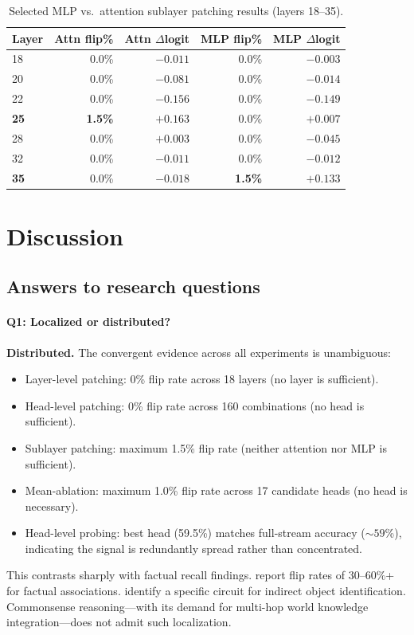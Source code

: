\documentclass{article}
\begin{document}
\begin{table}[t]
\centering
\small
\caption{Selected MLP vs.\ attention sublayer patching results (layers 18--35).}
\label{tab:sublayer}
\begin{tabular}{lrrrr}
\toprule
\textbf{Layer} & \textbf{Attn flip\%} & \textbf{Attn $\Delta$logit} & \textbf{MLP flip\%} & \textbf{MLP $\Delta$logit} \\
\midrule
18 & 0.0\% & $-0.011$ & 0.0\% & $-0.003$ \\
20 & 0.0\% & $-0.081$ & 0.0\% & $-0.014$ \\
22 & 0.0\% & $-0.156$ & 0.0\% & $-0.149$ \\
\textbf{25} & \textbf{1.5\%} & $\mathbf{+0.163}$ & 0.0\% & $+0.007$ \\
28 & 0.0\% & $+0.003$ & 0.0\% & $-0.045$ \\
32 & 0.0\% & $-0.011$ & 0.0\% & $-0.012$ \\
\textbf{35} & 0.0\% & $-0.018$ & \textbf{1.5\%} & $\mathbf{+0.133}$ \\
\bottomrule
\end{tabular}
\end{table}

\section{Discussion}
\label{sec:discussion}

\subsection{Answers to research questions}

\paragraph{Q1: Localized or distributed?}
\textbf{Distributed.} The convergent evidence across all experiments is unambiguous:
\begin{itemize}
    \item Layer-level patching: 0\% flip rate across 18 layers (no layer is sufficient).
    \item Head-level patching: 0\% flip rate across 160 combinations (no head is sufficient).
    \item Sublayer patching: maximum 1.5\% flip rate (neither attention nor MLP is sufficient).
    \item Mean-ablation: maximum 1.0\% flip rate across 17 candidate heads (no head is necessary).
    \item Head-level probing: best head (59.5\%) matches full-stream accuracy (${\sim}59$\%), indicating the signal is redundantly spread rather than concentrated.
\end{itemize}
This contrasts sharply with factual recall findings.
\citet{geva2023dissecting} report flip rates of 30--60\%+ for factual associations.
\citet{wang2022interpretability} identify a specific circuit for indirect object identification.
Commonsense reasoning---with its demand for multi-hop world knowledge integration---does not admit such localization.
\end{document}
